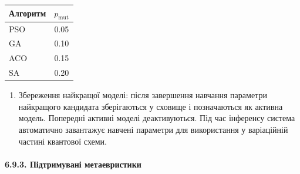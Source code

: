 \documentclass[12pt,a4paper]{article}
\begin{document}
{\def\LTcaptype{none} %

\begin{longtable}[]{@{}lc@{}}

\toprule\noalign{}

Алгоритм & \(p_{\text{mut}}\) \\

\midrule\noalign{}

\endhead

\bottomrule\noalign{}

\endlastfoot

PSO & 0.05 \\

GA & 0.10 \\

ACO & 0.15 \\

SA & 0.20 \\

\end{longtable}

}



\begin{enumerate}

\def\labelenumi{\arabic{enumi}.}

\setcounter{enumi}{3}

\tightlist

\item

  Збереження найкращої моделі: після завершення навчання параметри найкращого кандидата зберігаються у сховище і позначаються як активна модель. Попередні активні моделі деактивуються. Під час інференсу система автоматично завантажує навчені параметри для використання у варіаційній частині квантової схеми.

\end{enumerate}



\paragraph{6.9.3. Підтримувані метаевристики}\label{ux43fux456ux434ux442ux440ux438ux43cux443ux432ux430ux43dux456-ux43cux435ux442ux430ux435ux432ux440ux438ux441ux442ux438ux43aux438}
\end{document}
